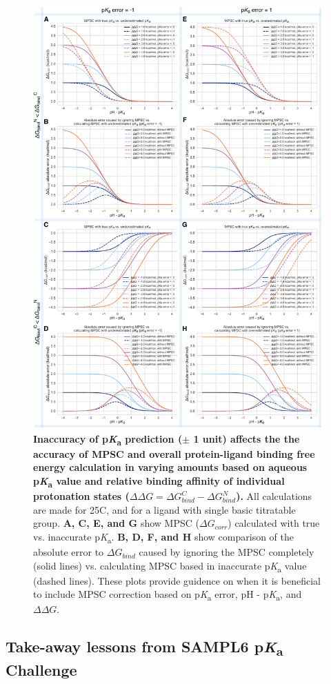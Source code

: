 \documentclass[9pt,lineno,final]{elife}
\newcommand{\pKa}{p\textit{K}\textsubscript{a}}
\begin{document}
\begin{figure}
\centering
\includegraphics[width=0.8\linewidth]{figures/pKa-inaccuracy-and-MPSC.pdf}
\caption{ {\bf Inaccuracy of \pKa{} prediction ($\pm$ 1 unit) affects the the accuracy of MPSC and overall protein-ligand binding free energy calculation in varying amounts based on aqueous \pKa{} value and relative binding affinity of individual protonation states ($\Delta\Delta G = \Delta G_{bind}^{C} - \Delta G_{bind}^{N}$).} 
All calculations are made for 25\degree C, and for a ligand with single basic titratable group. {\bf A, C, E, and G} show MPSC ($\Delta G_{corr}$) calculated with true vs. inaccurate \pKa{}. {\bf B, D, F, and H} show comparison of the absolute error to $\Delta G_{bind}$ caused by ignoring the MPSC completely (solid lines) vs. calculating MPSC based in inaccurate \pKa{} value (dashed lines). These plots provide guidence on when it is beneficial to include MPSC correction based on \pKa{} error, pH - \pKa{}, and $\Delta\Delta G$. 
}
\label{fig:pKa-inaccuracy-and-MPSC}
\end{figure}



\subsection{Take-away lessons from SAMPL6 \pKa{} Challenge}
\end{document}
